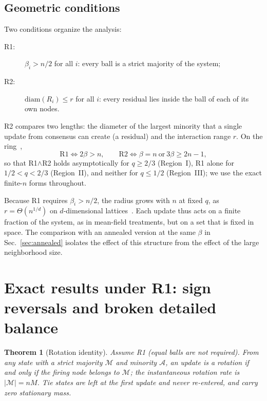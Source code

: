 \documentclass[aps,pre,reprint,superscriptaddress,amsmath,amssymb,longbibliography]{revtex4-2}
\newtheorem{theorem}{Theorem}
\theoremstyle{remark}
\begin{document}
\subsection{Geometric conditions}

Two conditions organize the analysis:
\begin{description}
\item[R1:] $\beta_i>n/2$ for all $i$: every ball is a strict majority of
the system;
\item[R2:] $\mathrm{diam}(R_i)\le r$ for all $i$: every residual lies
inside the ball of each of its own nodes.
\end{description}
R2 compares two lengths: the diameter of the largest minority that a
single update from consensus can create (a residual) and the interaction
range $r$. On the ring~\cite{SM},
\begin{equation}
\mathrm{R1}\iff2\beta>n,\qquad
\mathrm{R2}\iff\beta=n\ \text{or}\ 3\beta\ge2n-1,
\label{eq:ringconditions}
\end{equation}
so that R1$\wedge$R2 holds asymptotically for $q\ge2/3$ (Region~I), R1
alone for $1/2<q<2/3$ (Region~II), and neither for $q\le1/2$
(Region~III); we use the exact finite-$n$ forms throughout.

Because R1 requires $\beta_i>n/2$, the radius grows with $n$ at fixed
$q$, as $r=\Theta(n^{1/d})$ on $d$-dimensional
lattices~\cite{SM}. Each update thus acts on a finite fraction of the
system, as in mean-field treatments, but on a set that is fixed in
space. The comparison with an annealed version at the same $\beta$ in
Sec.~\ref{sec:annealed} isolates the effect of this structure from the
effect of the large neighborhood size.

\section{Exact results under R1: sign reversals and broken detailed balance}
\label{sec:R1}

\begin{theorem}[Rotation identity]
\label{thm:rotation}
Assume R1 (equal balls are not required). From any state with a strict
majority $\mathcal M$ and minority $\mathcal A$, an update is a rotation
if and only if the firing node belongs to $\mathcal M$; the
instantaneous rotation rate is $|\mathcal M|=nM$. Tie states are left at
the first update and never re-entered, and carry zero stationary mass.
\end{theorem}
\end{document}
